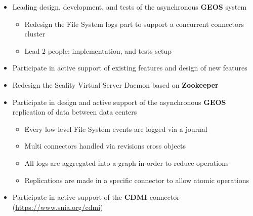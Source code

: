 \documentclass[11pt, a4paper]{moderncv}
\begin{document}
\vspace{1em}
{
  \begin{itemize}
    \renewcommand{\labelitemi}{$\bullet$  }
    \item Leading design, development, and tests of the asynchronous \textbf{GEOS} system
      \begin{itemize}
        \item Redesign the File System logs part to support a concurrent connectors cluster
        \item Lead 2 people: implementation, and tests setup
      \end{itemize}
  \end{itemize}
}
{
  \begin{itemize}
    \renewcommand{\labelitemi}{$\bullet$  }
    \item Participate in active support of existing features and design of new features
    \item Redesign the Scality Virtual Server Daemon based on \textbf{Zookeeper}
    \item Participate in design and active support of the asynchronous \textbf{GEOS}
      replication of data between data centers
      \begin{itemize}
        \item Every low level File System events are logged via a journal
        \item Multi connectors handled via revisions cross objects
        \item All logs are aggregated into a graph in order to reduce operations
        \item Replications are made in a specific connector to allow atomic operations
      \end{itemize}
    \item Participate in active support of the \textbf{CDMI} connector (\url{https://www.snia.org/cdmi})
  \end{itemize}
}
\end{document}
